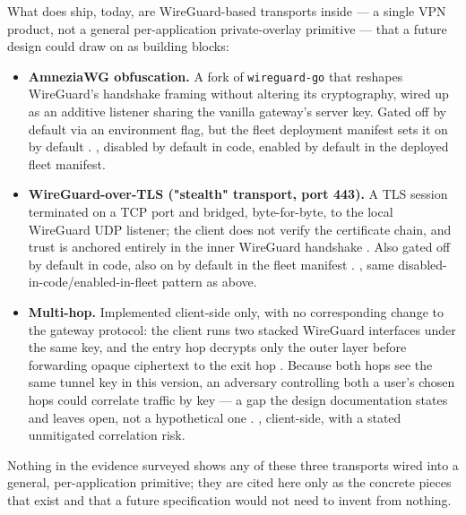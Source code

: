 What does ship, today, are WireGuard-based transports inside \CumulusVPN — a single VPN product,
not a general per-application private-overlay primitive — that a future \VPON design could draw
on as building blocks:
\begin{itemize}
  \item \textbf{AmneziaWG obfuscation.} A fork of \texttt{wireguard-go} that reshapes WireGuard's
  handshake framing without altering its cryptography, wired up as an additive listener sharing
  the vanilla gateway's server key. Gated off by default via an environment flag, but the fleet
  deployment manifest sets it on by default
  . \shipped, disabled by default in code, enabled
  by default in the deployed fleet manifest.
  \item \textbf{WireGuard-over-TLS ("stealth" transport, port 443).} A TLS session terminated on a
  TCP port and bridged, byte-for-byte, to the local WireGuard UDP listener; the client does not
  verify the certificate chain, and trust is anchored entirely in the inner WireGuard handshake
  . Also gated off by default
  in code, also on by default in the fleet manifest
  . \shipped, same disabled-in-code/enabled-in-fleet
  pattern as above.
  \item \textbf{Multi-hop.} Implemented client-side only, with no corresponding change to the
  gateway protocol: the client runs two stacked WireGuard interfaces under the same key, and the
  entry hop decrypts only the outer layer before forwarding opaque ciphertext to the exit hop
  . Because both hops see the same tunnel key in this
  version, an adversary controlling both a user's chosen hops could correlate traffic by key — a
  gap the design documentation states and leaves open, not a hypothetical one
  . \shipped, client-side, with a stated unmitigated
  correlation risk.
\end{itemize}
Nothing in the evidence surveyed shows any of these three transports wired into a general,
per-application \VPON primitive; they are cited here only as the concrete pieces that exist and
that a future \VPON specification would not need to invent from nothing.

\FloatBarrier

